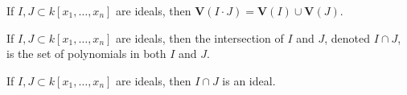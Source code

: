                 \begin{theorem}
                    If $I,J\subset k[x_1,\hdots ,x_n]$
                    are ideals, then
                    $\mathbf{V}(I\cdot J)=\mathbf{V}(I)\cup\mathbf{V}(J)$.
                \end{theorem}
                \begin{definition}
                    If $I,J\subset k[x_1,\hdots ,x_n]$ are ideals,
                    then the intersection of $I$ and $J$,
                    denoted $I\cap J$, is the set of polynomials
                    in both $I$ and $J$.
                \end{definition}
                \begin{theorem}
                    If $I,J\subset k[x_1,\hdots ,x_n]$ are ideals,
                    then $I\cap J$ is an ideal.
                \end{theorem}
